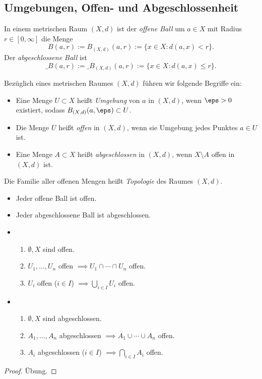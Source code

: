 \subsection{Umgebungen, Offen- und Abgeschlossenheit}

\begin{df}
	In einem metrischen Raum $(X,d)$ ist der \emph{offene Ball} um $a \in X$ mit Radius $r\in [0,\infty]$ die Menge
	\[
		B(a,r) := B_{(X,d)}(a, r) := \{ x \in X : d(a,x) < r \}.
	\]
	Der \emph{abgeschlossene Ball} ist
	\[
		\_{B}(a,r) := \_{B}_{(X,d)}(a, r) := \{ x \in X : d(a,x) \le r \}.
	\]
\end{df}

\begin{df} \label{df:metric_space_terms}
	Bezüglich eines metrischen Raumes $(X,d)$ führen wir folgende Begriffe ein:
	\begin{itemize}
		\item
			Eine Menge $U \subset X$ heißt \emph{Umgebung} von $a$ in $(X,d)$, wenn $\eps > 0$ existiert, sodass $B_{(X,d)}(a,\eps) \subset U$.
		\item
			Die Menge $U$ heißt \emph{offen} in $(X,d)$, wenn sie Umgebung jedes Punktes $a \in U$ ist.
		\item
			Eine Menge $A \subset X$ heißt \emph{abgeschlossen} in $(X,d)$, wenn $X \setminus A$ offen in $(X,d)$ ist.
	\end{itemize}

	Die Familie aller offenen Mengen heißt \emph{Topologie} des Raumes $(X,d)$.
\end{df}

\begin{prop}
	\begin{itemize}
		\item
			Jeder offene Ball ist offen.
		\item
			Jeder abgeschlossene Ball ist abgeschlossen.
		\item
			\begin{enumerate}[(O1),leftmargin=*]
				\item
					$\emptyset, X$ sind offen.
				\item
					$U_1,\dotsc,U_n$ offen $\implies U_1 \cap \dotsb \cap U_n$ offen.
				\item
					$U_i$ offen ($i\in I$) $\implies \bigcup_{i\in I} U_i$ offen.
			\end{enumerate}
		\item
			\begin{enumerate}[({A}1),leftmargin=*]
				\item
					$\emptyset, X$ sind abgeschlossen.
				\item
					$A_1,\dotsc,A_n$ abgeschlossen $\implies A_1 \cup \dotsb \cup A_n$ offen.
				\item
					$A_i$ abgeschlossen ($i\in I$) $\implies \bigcap_{i\in I} A_i$ offen.
			\end{enumerate}
	\end{itemize}
	\begin{proof}
		Übung.
	\end{proof}
\end{prop}

